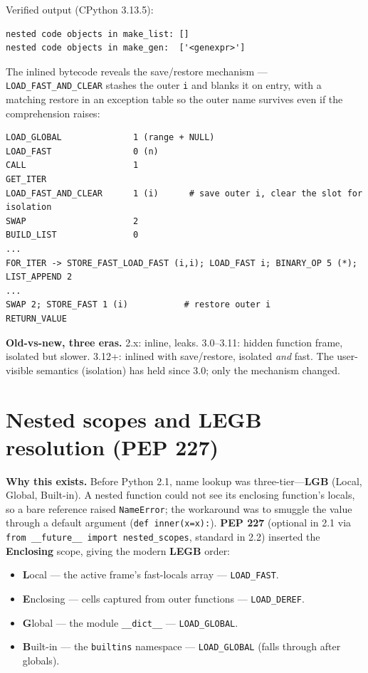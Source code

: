 Verified output (CPython 3.13.5):

\begin{lstlisting}[caption={Output}]
nested code objects in make_list: []
nested code objects in make_gen:  ['<genexpr>']
\end{lstlisting}

The inlined bytecode reveals the save/restore mechanism --- \texttt{LOAD\_FAST\_AND\_CLEAR}
stashes the outer \texttt{i} and blanks it on entry, with a matching restore in an exception
table so the outer name survives even if the comprehension raises:

\begin{lstlisting}[caption={dis of [i*i for i in range(n)] on CPython 3.13.5 (excerpt)}]
LOAD_GLOBAL              1 (range + NULL)
LOAD_FAST                0 (n)
CALL                     1
GET_ITER
LOAD_FAST_AND_CLEAR      1 (i)      # save outer i, clear the slot for isolation
SWAP                     2
BUILD_LIST               0
...
FOR_ITER -> STORE_FAST_LOAD_FAST (i,i); LOAD_FAST i; BINARY_OP 5 (*); LIST_APPEND 2
...
SWAP 2; STORE_FAST 1 (i)           # restore outer i
RETURN_VALUE
\end{lstlisting}

\textbf{Old-vs-new, three eras.} 2.x: inline, leaks. 3.0--3.11: hidden function frame,
isolated but slower. 3.12+: inlined with save/restore, isolated \emph{and} fast. The
user-visible semantics (isolation) has held since 3.0; only the mechanism changed.

\section{Nested scopes and LEGB resolution (PEP 227)}

\textbf{Why this exists.} Before Python 2.1, name lookup was three-tier---\textbf{LGB} (Local,
Global, Built-in). A nested function could not see its enclosing function's locals, so a bare
reference raised \texttt{NameError}; the workaround was to smuggle the value through a default
argument (\texttt{def inner(x=x):}). \textbf{PEP 227} (optional in 2.1 via
\texttt{from \_\_future\_\_ import nested\_scopes}, standard in 2.2) inserted the
\textbf{Enclosing} scope, giving the modern \textbf{LEGB} order:

\begin{itemize}
  \item \textbf{L}ocal --- the active frame's fast-locals array --- \texttt{LOAD\_FAST}.
  \item \textbf{E}nclosing --- cells captured from outer functions --- \texttt{LOAD\_DEREF}.
  \item \textbf{G}lobal --- the module \texttt{\_\_dict\_\_} --- \texttt{LOAD\_GLOBAL}.
  \item \textbf{B}uilt-in --- the \texttt{builtins} namespace --- \texttt{LOAD\_GLOBAL}
    (falls through after globals).
\end{itemize}

